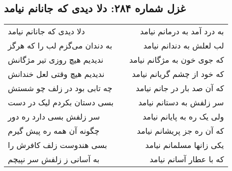 \begin{center}
\section*{غزل شماره ۲۸۴: دلا دیدی که جانانم نیامد}
\label{sec:284}
\begin{longtable}{l p{0.5cm} r}
دلا دیدی که جانانم نیامد
&&
به درد آمد به درمانم نیامد
\\
به دندان می‌گزم لب را که هرگز
&&
لب لعلش به دندانم نیامد
\\
ندیدیم هیچ روزی تیر مژگانش
&&
که جوی خون به مژگانم نیامد
\\
ندیدیم هیچ وقتی لعل خندانش
&&
که خود از چشم گریانم نیامد
\\
چه تابی بود در زلف چو شستش
&&
که آن صد بار در جانم نیامد
\\
بسی دستان بکردم لیک در دست
&&
سر زلفش به دستانم نیامد
\\
سر زلفش بسی دارد ره دور
&&
ولی یک ره به پایانم نیامد
\\
چگونه آن همه ره پیش گیرم
&&
که آن ره جز پریشانم نیامد
\\
بسی هندوست زلف کافرش را
&&
یکی زانها مسلمانم نیامد
\\
به آسانی ز زلفش سر نپیچم
&&
که با عطار آسانم نیامد
\\
\end{longtable}
\end{center}
